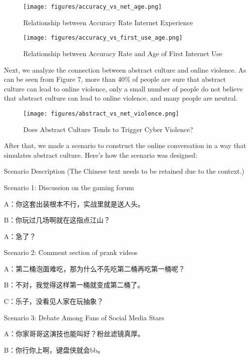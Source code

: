 \documentclass[12pt,a4paper]{ctexart}
\begin{document}
\begin{figure}[htbp]
    \centering
    \texttt{[image: figures/accuracy\_vs\_net\_age.png]}
    \caption{Relationship between Accuracy Rate Internet Experience}
    \label{fig:accuracy_vs_net_age}
\end{figure}

\begin{figure}[htbp]
    \centering
    \texttt{[image: figures/accuracy\_vs\_first\_use\_age.png]}
    \caption{Relationship between Accuracy Rate and Age of First Internet Use}
    \label{fig:accuracy_vs_first_use_age}
\end{figure}

Next, we analyze the connection between abstract culture and online violence. As can be seen from Figure 7, more than 40\% of people are sure that abstract culture can lead to online violence, only a small number of people do not believe that abstract culture can lead to online violence, and many people are neutral.

\begin{figure}[htbp]
    \centering
    \texttt{[image: figures/abstract\_vs\_net\_violence.png]}
    \caption{Does Abstract Culture Tends to Trigger Cyber Violence?}
    \label{fig:abstract_vs_net_violence}
\end{figure}

After that, we made a scenario to construct the online conversation in a way that simulates abstract culture. Here's how the scenario was designed:

Scenario Description (The Chinese text needs to be retained due to the context.)

Scenario 1: Discussion on the gaming forum

A：你这套出装根本不行，实战里就是送人头。

B：你玩过几场啊就在这指点江山？

A：急了？

Scenario 2: Comment section of prank videos

A：第二桶泡面难吃，那为什么不先吃第二桶再吃第一桶呢？

B：不对，我觉得这样第一桶就变成第二桶了。

C：乐子，没看见人家在玩抽象？

Scenario 3: Debate Among Fans of Social Media Stars

A：你家哥哥这演技也能叫好？粉丝滤镜真厚。

B：你行你上啊，键盘侠就会bb。
\end{document}
